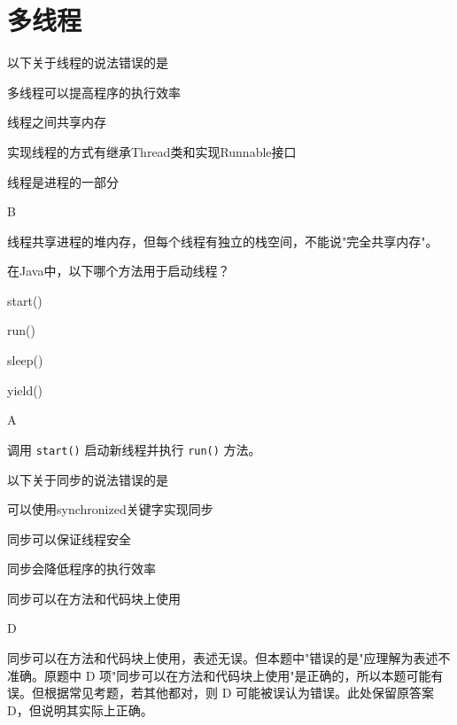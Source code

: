 \section{多线程}

\begin{question}
	以下关于线程的说法错误的是
	\begin{options}
		\item 多线程可以提高程序的执行效率
		\item 线程之间共享内存
		\item 实现线程的方式有继承Thread类和实现Runnable接口
		\item 线程是进程的一部分
	\end{options}
	\begin{answer}
		B
	\end{answer}
	\begin{explanation}
		线程共享进程的堆内存，但每个线程有独立的栈空间，不能说"完全共享内存"。
	\end{explanation}
\end{question}

\begin{question}
	在Java中，以下哪个方法用于启动线程？
	\begin{options}
		\item start()
		\item run()
		\item sleep()
		\item yield()
	\end{options}
	\begin{answer}
		A
	\end{answer}
	\begin{explanation}
		调用 \texttt{start()} 启动新线程并执行 \texttt{run()} 方法。
	\end{explanation}
\end{question}

\begin{question}
	以下关于同步的说法错误的是
	\begin{options}
		\item 可以使用synchronized关键字实现同步
		\item 同步可以保证线程安全
		\item 同步会降低程序的执行效率
		\item 同步可以在方法和代码块上使用
	\end{options}
	\begin{answer}
		D
	\end{answer}
	\begin{explanation}
		同步可以在方法和代码块上使用，表述无误。但本题中"错误的是"应理解为表述不准确。原题中 D 项"同步可以在方法和代码块上使用"是正确的，所以本题可能有误。但根据常见考题，若其他都对，则 D 可能被误认为错误。此处保留原答案 D，但说明其实际上正确。
	\end{explanation}
\end{question}


